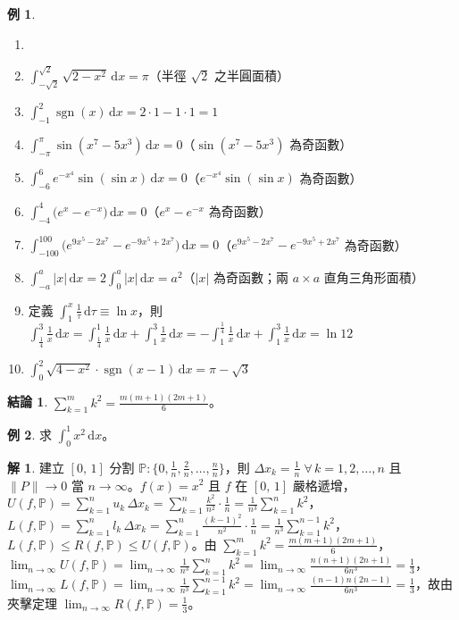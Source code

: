 \documentclass[12pt]{extarticle}
\newcommand{\ds}{\displaystyle}
\DeclareMathOperator*{\sgn}{sgn}
\theoremstyle{definition}
\newtheorem*{fact}{結論}
\newtheorem*{ex}{例}
\newtheorem*{sol}{解}
\begin{document}
\begin{ex}
  \begin{enumerate}\setlength\itemsep{0em}
    \item[]
    \item $\ds\int_{-\sqrt{2}}^{\sqrt{2}} \sqrt{2 - x^2}\,\mathrm{d}x = \pi$（半徑 $\sqrt{2}$ 之半圓面積）
    \item $\ds\int_{-1}^2 \sgn(x)\,\mathrm{d}x = 2\cdot 1 - 1\cdot 1 = 1$
    \item $\ds\int_{-\pi}^{\pi} \sin(x^7-5x^3)\,\mathrm{d}x = 0$（$\sin(x^7-5x^3)$ 為奇函數）
    \item $\ds\int_{-6}^{6} e^{-x^4}\sin(\sin x)\,\mathrm{d}x = 0$（$e^{-x^4}\sin(\sin x)$ 為奇函數）
    \item $\ds\int_{-4}^{4} \big(e^{x} - e^{-x}\big)\,\mathrm{d}x = 0$（$e^{x} - e^{-x}$ 為奇函數）
    \item $\ds\int_{-100}^{100} \big(e^{9x^5-2x^7} - e^{-9x^5 + 2x^7}\big)\,\mathrm{d}x = 0$（$e^{9x^5-2x^7} - e^{-9x^5 + 2x^7}$ 為奇函數） 
    \item $\ds\int_{-a}^a |x|\,\mathrm{d}x = 2\int_0^a |x|\,\mathrm{d}x = a^2$（$|x|$ 為奇函數；兩 $a\times a$ 直角三角形面積）
    \item 定義 $\ds\int_1^x\frac{1}{\tau}\,\mathrm{d}\tau\equiv\ln x$，則 $\ds\int_{\frac{1}{4}}^3\frac{1}{x}\,\mathrm{d}x = \int_{\frac{1}{4}}^1 \frac{1}{x}\,\mathrm{d}x + \int_1^3 \frac{1}{x}\,\mathrm{d}x = -\int_1^{\frac{1}{4}}\frac{1}{x}\,\mathrm{d}x + \int_1^3\frac{1}{x}\,\mathrm{d}x = \ln 12$
    \item $\ds\int_0^2 \sqrt{4 - x^2}\cdot\sgn(x - 1)\,\mathrm{d}x = \pi - \sqrt{3}$ 
  \end{enumerate}
\end{ex}

\begin{fact}
  $\ds\sum_{k = 1}^m k^2 = \frac{m(m + 1)(2m + 1)}{6}$。
\end{fact}

\begin{ex}
  求 $\ds\int_0^1 x^2\,\text{d}x$。
\end{ex}

\begin{sol}
  建立 $\ds [0,\,1]$ 分割 $\ds\mathbb{P}: \Big\{0, \frac{1}{n}, \frac{2}{n}, \ldots, \frac{n}{n}\Big\}$，則 $\ds\Delta x_k = \frac{1}{n}\;\forall\,k=1,2,\ldots,n$ 且 $\ds\|P\|\to 0$ 當 $n\to\infty$。$f(x) = x^2$ 且 $f$ 在 $[0,\,1]$ 嚴格遞增，$\ds U(f,\mathbb{P}) = \sum_{k=1}^n u_k\,\Delta x_k = \sum_{k=1}^n\frac{k^2}{n^2}\cdot\frac{1}{n} = \frac{1}{n^3}\sum_{k = 1}^n k^2$，$\ds L(f,\mathbb{P}) = \sum_{k=1}^n l_k\,\Delta x_k = \sum_{k=1}^n\frac{(k - 1)^2}{n^2}\cdot\frac{1}{n} = \frac{1}{n^3}\sum_{k = 1}^{n-1}k^2$，$\ds L(f,\mathbb{P})\leqslant R(f,\mathbb{P})\leqslant U(f, \mathbb{P})$。由 $\ds\sum_{k = 1}^m k^2 = \frac{m(m + 1)(2m + 1)}{6}$，$\ds\lim_{n\to\infty} U(f,\mathbb{P}) = \lim_{n\to\infty}\frac{1}{n^3}\sum_{k = 1}^n k^2 = \lim_{n\to\infty}\frac{n(n + 1)(2 n + 1)}{6n^3} = \frac{1}{3}$，$\ds\lim_{n\to\infty} L(f,\mathbb{P}) = \lim_{n\to\infty}\frac{1}{n^3}\sum_{k = 1}^{n - 1} k^2 = \lim_{n\to\infty}\frac{(n - 1)n(2 n - 1)}{6n^3} = \frac{1}{3}$，故由夾擊定理 $\ds\lim_{n\to\infty} R(f,\mathbb{P}) = \frac{1}{3}$。
\end{sol}
\end{document}
